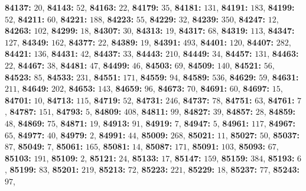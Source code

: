 \textsf{\bfseries 84137:} $20$, \textsf{\bfseries 84143:} $52$, \textsf{\bfseries 84163:} $22$, \textsf{\bfseries 84179:} $35$, \textsf{\bfseries 84181:} $131$, \textsf{\bfseries 84191:} $183$, \textsf{\bfseries 84199:} $52$, \textsf{\bfseries 84211:} $60$, \textsf{\bfseries 84221:} $188$, \textsf{\bfseries 84223:} $55$, \textsf{\bfseries 84229:} $32$, \textsf{\bfseries 84239:} $350$, \textsf{\bfseries 84247:} $12$, \textsf{\bfseries 84263:} $102$, \textsf{\bfseries 84299:} $18$, \textsf{\bfseries 84307:} $30$, \textsf{\bfseries 84313:} $19$, \textsf{\bfseries 84317:} $68$, \textsf{\bfseries 84319:} $113$, \textsf{\bfseries 84347:} $127$, \textsf{\bfseries 84349:} $162$, \textsf{\bfseries 84377:} $22$, \textsf{\bfseries 84389:} $19$, \textsf{\bfseries 84391:} $493$, \textsf{\bfseries 84401:} $120$, \textsf{\bfseries 84407:} $282$, \textsf{\bfseries 84421:} $136$, \textsf{\bfseries 84431:} $42$, \textsf{\bfseries 84437:} $33$, \textsf{\bfseries 84443:} $210$, \textsf{\bfseries 84449:} $34$, \textsf{\bfseries 84457:} $131$, \textsf{\bfseries 84463:} $22$, \textsf{\bfseries 84467:} $38$, \textsf{\bfseries 84481:} $47$, \textsf{\bfseries 84499:} $46$, \textsf{\bfseries 84503:} $69$, \textsf{\bfseries 84509:} $140$, \textsf{\bfseries 84521:} $56$, \textsf{\bfseries 84523:} $85$, \textsf{\bfseries 84533:} $231$, \textsf{\bfseries 84551:} $171$, \textsf{\bfseries 84559:} $94$, \textsf{\bfseries 84589:} $536$, \textsf{\bfseries 84629:} $59$, \textsf{\bfseries 84631:} $211$, \textsf{\bfseries 84649:} $202$, \textsf{\bfseries 84653:} $143$, \textsf{\bfseries 84659:} $96$, \textsf{\bfseries 84673:} $70$, \textsf{\bfseries 84691:} $60$, \textsf{\bfseries 84697:} $15$, \textsf{\bfseries 84701:} $10$, \textsf{\bfseries 84713:} $115$, \textsf{\bfseries 84719:} $52$, \textsf{\bfseries 84731:} $246$, \textsf{\bfseries 84737:} $78$, \textsf{\bfseries 84751:} $63$, \textsf{\bfseries 84761:} $7$, \textsf{\bfseries 84787:} $151$, \textsf{\bfseries 84793:} $5$, \textsf{\bfseries 84809:} $408$, \textsf{\bfseries 84811:} $99$, \textsf{\bfseries 84827:} $39$, \textsf{\bfseries 84857:} $28$, \textsf{\bfseries 84859:} $48$, \textsf{\bfseries 84869:} $75$, \textsf{\bfseries 84871:} $19$, \textsf{\bfseries 84913:} $91$, \textsf{\bfseries 84919:} $7$, \textsf{\bfseries 84947:} $5$, \textsf{\bfseries 84961:} $117$, \textsf{\bfseries 84967:} $65$, \textsf{\bfseries 84977:} $40$, \textsf{\bfseries 84979:} $2$, \textsf{\bfseries 84991:} $44$, \textsf{\bfseries 85009:} $268$, \textsf{\bfseries 85021:} $11$, \textsf{\bfseries 85027:} $50$, \textsf{\bfseries 85037:} $87$, \textsf{\bfseries 85049:} $7$, \textsf{\bfseries 85061:} $165$, \textsf{\bfseries 85081:} $14$, \textsf{\bfseries 85087:} $171$, \textsf{\bfseries 85091:} $103$, \textsf{\bfseries 85093:} $67$, \textsf{\bfseries 85103:} $191$, \textsf{\bfseries 85109:} $2$, \textsf{\bfseries 85121:} $24$, \textsf{\bfseries 85133:} $17$, \textsf{\bfseries 85147:} $159$, \textsf{\bfseries 85159:} $384$, \textsf{\bfseries 85193:} $6$, \textsf{\bfseries 85199:} $83$, \textsf{\bfseries 85201:} $219$, \textsf{\bfseries 85213:} $72$, \textsf{\bfseries 85223:} $221$, \textsf{\bfseries 85229:} $18$, \textsf{\bfseries 85237:} $77$, \textsf{\bfseries 85243:} $97$, 

